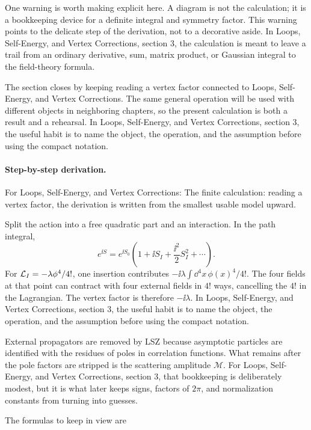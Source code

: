 One warning is worth making explicit here.  A diagram is not the calculation; it is a bookkeeping device for a definite integral and symmetry factor.  This warning points to the delicate step of the derivation, not to a decorative aside.  In Loops, Self-Energy, and Vertex Corrections, section 3, the calculation is meant to leave a trail from an ordinary derivative, sum, matrix product, or Gaussian integral to the field-theory formula.

The section closes by keeping reading a vertex factor connected to Loops, Self-Energy, and Vertex Corrections.  The same general operation will be used with different objects in neighboring chapters, so the present calculation is both a result and a rehearsal.  In Loops, Self-Energy, and Vertex Corrections, section 3, the useful habit is to name the object, the operation, and the assumption before using the compact notation.



\paragraph{Step-by-step derivation.}

For Loops, Self-Energy, and Vertex Corrections: The finite calculation: reading a vertex factor, the derivation is written from the smallest usable model upward.

Split the action into a free quadratic part and an interaction.  In the path integral,
\[
  e^{\ii S}=e^{\ii S_0}\left(1+\ii S_I+\frac{\ii^2}{2}S_I^2+\cdots\right).
\]
For \(\mathcal L_I=-\lambda\phi^4/4!\), one insertion contributes \(-\ii\lambda\int\dd^4x\,\phi(x)^4/4!\).  The four fields at that point can contract with four external fields in \(4!\) ways, cancelling the \(4!\) in the Lagrangian.  The vertex factor is therefore \(-\ii\lambda\).  In Loops, Self-Energy, and Vertex Corrections, section 3, the useful habit is to name the object, the operation, and the assumption before using the compact notation.

External propagators are removed by LSZ because asymptotic particles are identified with the residues of poles in correlation functions.  What remains after the pole factors are stripped is the scattering amplitude \(\mathcal M\).  For Loops, Self-Energy, and Vertex Corrections, section 3, that bookkeeping is deliberately modest, but it is what later keeps signs, factors of \(2\pi\), and normalization constants from turning into guesses.

The formulas to keep in view are

